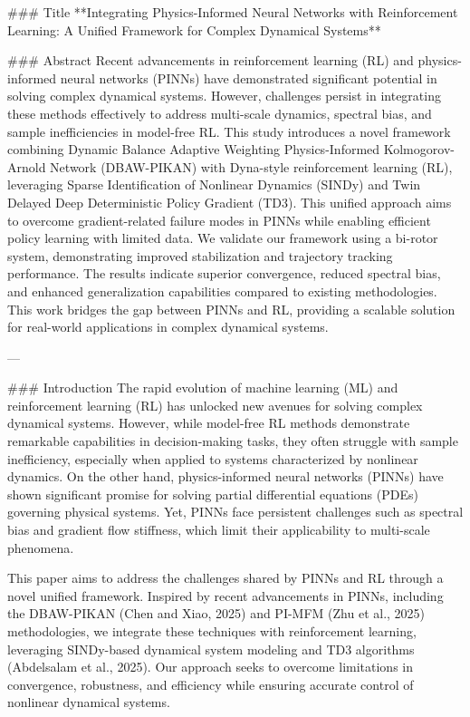 ### Title
**Integrating Physics-Informed Neural Networks with Reinforcement Learning: A Unified Framework for Complex Dynamical Systems**

### Abstract
Recent advancements in reinforcement learning (RL) and physics-informed neural networks (PINNs) have demonstrated significant potential in solving complex dynamical systems. However, challenges persist in integrating these methods effectively to address multi-scale dynamics, spectral bias, and sample inefficiencies in model-free RL. This study introduces a novel framework combining Dynamic Balance Adaptive Weighting Physics-Informed Kolmogorov-Arnold Network (DBAW-PIKAN) with Dyna-style reinforcement learning (RL), leveraging Sparse Identification of Nonlinear Dynamics (SINDy) and Twin Delayed Deep Deterministic Policy Gradient (TD3). This unified approach aims to overcome gradient-related failure modes in PINNs while enabling efficient policy learning with limited data. We validate our framework using a bi-rotor system, demonstrating improved stabilization and trajectory tracking performance. The results indicate superior convergence, reduced spectral bias, and enhanced generalization capabilities compared to existing methodologies. This work bridges the gap between PINNs and RL, providing a scalable solution for real-world applications in complex dynamical systems.

---

### Introduction
The rapid evolution of machine learning (ML) and reinforcement learning (RL) has unlocked new avenues for solving complex dynamical systems. However, while model-free RL methods demonstrate remarkable capabilities in decision-making tasks, they often struggle with sample inefficiency, especially when applied to systems characterized by nonlinear dynamics. On the other hand, physics-informed neural networks (PINNs) have shown significant promise for solving partial differential equations (PDEs) governing physical systems. Yet, PINNs face persistent challenges such as spectral bias and gradient flow stiffness, which limit their applicability to multi-scale phenomena.

This paper aims to address the challenges shared by PINNs and RL through a novel unified framework. Inspired by recent advancements in PINNs, including the DBAW-PIKAN (Chen and Xiao, 2025) and PI-MFM (Zhu et al., 2025) methodologies, we integrate these techniques with reinforcement learning, leveraging SINDy-based dynamical system modeling and TD3 algorithms (Abdelsalam et al., 2025). Our approach seeks to overcome limitations in convergence, robustness, and efficiency while ensuring accurate control of nonlinear dynamical systems.

